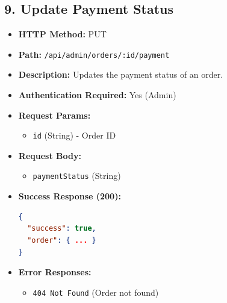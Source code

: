 \documentclass[12pt,a4paper]{article}
\begin{document}
\subsection{9. Update Payment Status}
\begin{itemize}
    \item \textbf{HTTP Method:} PUT
    \item \textbf{Path:} \texttt{/api/admin/orders/:id/payment}
    \item \textbf{Description:} Updates the payment status of an order.
    \item \textbf{Authentication Required:} Yes (Admin)
    \item \textbf{Request Params:}
    \begin{itemize}
        \item \texttt{id} (String) - Order ID
    \end{itemize}
    \item \textbf{Request Body:}
    \begin{itemize}
        \item \texttt{paymentStatus} (String)
    \end{itemize}
    \item \textbf{Success Response (200):}
\begin{lstlisting}[language=json]
{
  "success": true,
  "order": { ... }
}
\end{lstlisting}
    \item \textbf{Error Responses:}
    \begin{itemize}
        \item \texttt{404 Not Found} (Order not found)
    \end{itemize}
\end{itemize}
\end{document}
